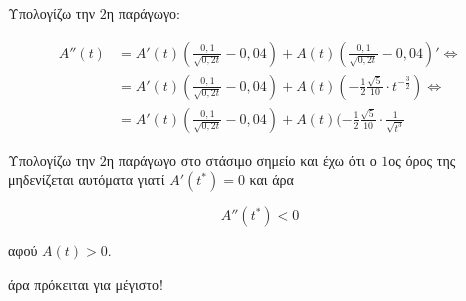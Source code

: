 \documentclass[a4paper,12pt]{article}
\begin{document}
Υπολογίζω την $2$η παράγωγο: 

\begin{align*}
A''(t) &= A'(t)(\frac{0,1}{\sqrt{0,2t}}-0,04) + A(t)(\frac{0,1}{\sqrt{0,2t}}-0,04)' \Leftrightarrow \\
&= A'(t) (\frac{0,1}{\sqrt{0,2t}}-0,04) + A(t)(-\frac{1}{2}\frac{\sqrt{5}}{10}\cdot t^{-\frac{3}{2}}) \Leftrightarrow \\
&= A'(t) (\frac{0,1}{\sqrt{0,2t}}-0,04) + A(t)(-\frac{1}{2}\frac{\sqrt{5}}{10}\cdot \frac{1}{\sqrt{t^3}} 
\end{align*}

Υπολογίζω την $2$η παράγωγο στο στάσιμο σημείο και έχω ότι ο $1$ος όρος της μηδενίζεται αυτόματα γιατί $A'(t^*)=0$ και άρα

\[Α''(t^*) <0 \]

αφού $A(t)>0$.

άρα πρόκειται για μέγιστο!
\end{document}
